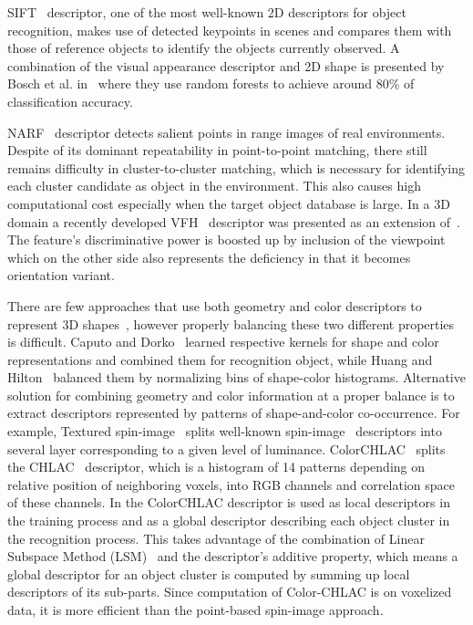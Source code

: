 \documentclass[conference]{sty/IEEEtran}
\begin{document}
SIFT~\cite{lowe04distinctive} descriptor, one of the most well-known 2D
descriptors for object recognition, makes use of detected keypoints in
scenes and compares them with those of reference objects to identify the
objects currently observed. A combination of the visual appearance
descriptor and 2D shape is presented by Bosch et al. in~\cite{Bosch07shape}
where they use random forests to achieve around 80\% of classification 
accuracy. 

NARF~\cite{steder10irosws} descriptor detects salient points in range images of
real environments. Despite of its dominant
repeatability in point-to-point matching, there still remains difficulty in
cluster-to-cluster matching, which is necessary for identifying each cluster
candidate as object in the environment. This also causes high computational cost
especially when the target object database is large. In a 3D domain a recently 
developed VFH~\cite{vfh} descriptor was presented as an extension 
of~\cite{Rusu09ICRA}. The feature's discriminative power is boosted up
by inclusion of the viewpoint which on the other side also represents
the deficiency in that it becomes orientation variant. 

There are few approaches that use both geometry and color descriptors to
represent 3D shapes~\cite{park2006}, however properly balancing these two
different properties is difficult.  Caputo and Dorko~\cite{caputo2002} learned
respective kernels for shape and color representations and combined them for
recognition object, while Huang and Hilton~\cite{huang2009} balanced them by
normalizing bins of shape-color histograms.  Alternative solution for combining
geometry and color information at a proper balance is to extract descriptors
represented by patterns of shape-and-color co-occurrence.  For example, Textured
spin-image~\cite{cortelazzo2006} splits well-known
spin-image~\cite{Johnson_spin_images} descriptors into several layer
corresponding to a given level of luminance. ColorCHLAC~\cite{kanezaki2010icra} 
splits the CHLAC~\cite{kobayashi2004} descriptor, which is a histogram of 14 patterns 
depending on relative position of neighboring voxels, into RGB channels and correlation 
space of these channels.  In \cite{kanezaki2010icra} the ColorCHLAC descriptor is used as local
descriptors in the training process and as a global descriptor describing each
object cluster in the recognition process. This takes advantage of the combination
of Linear Subspace Method (LSM)~\cite{watanabe1973} and the descriptor's additive property, 
which means a global descriptor for an object cluster is computed by summing up local descriptors of its sub-parts.
Since computation of Color-CHLAC is on voxelized data, it is more efficient
than the point-based spin-image approach.
\end{document}

